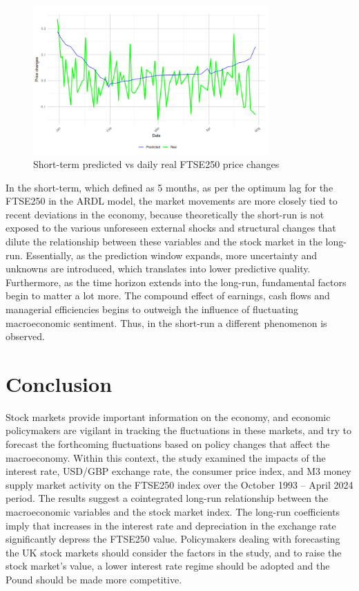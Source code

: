 \documentclass[11pt,a4paper]{article}
\begin{document}
\begin{figure}[h]
    \centering
    \includegraphics[width=0.8\textwidth]{short-term-daily.png}
    \caption{Short-term predicted vs daily real FTSE250 price changes}
    \label{fig:sdaily}
\end{figure}


In the short-term, which defined as 5 months, 
as per the optimum lag for the FTSE250 in the ARDL model, the market movements
are more closely tied to recent deviations in the economy, because theoretically
the short-run is not exposed to the various unforeseen external shocks and structural changes
that dilute the relationship between these variables and the stock market in the 
long-run. Essentially, as the prediction window expands, 
more uncertainty and unknowns are introduced, which translates into 
lower predictive quality. Furthermore, as the time horizon extends into the long-run, fundamental factors 
begin to matter a lot more. The compound effect of earnings, cash flows and
managerial efficiencies begins to outweigh the 
influence of fluctuating macroeconomic sentiment. Thus, in the short-run 
a different phenomenon is observed.





\section{Conclusion}

Stock markets provide important information on the economy, 
and economic policymakers are vigilant in tracking the fluctuations 
in these markets, and try to forecast the 
forthcoming fluctuations based on policy changes that affect the macroeconomy.
Within this context, the study examined the 
impacts of the interest rate, USD/GBP
exchange rate, the consumer price index, and 
M3 money supply market activity on
the FTSE250 index over the October 1993 – April 2024 period.
The results suggest a cointegrated long-run
relationship between the macroeconomic variables and the stock market index. 
The long-run coefficients imply that
increases in the interest rate and depreciation in the exchange rate
significantly depress the FTSE250 value. 
Policymakers dealing with forecasting the UK stock markets
should consider the factors in the study, and to raise the stock
market's value, a lower interest rate regime should be adopted and 
the Pound should be made more competitive.
\end{document}
